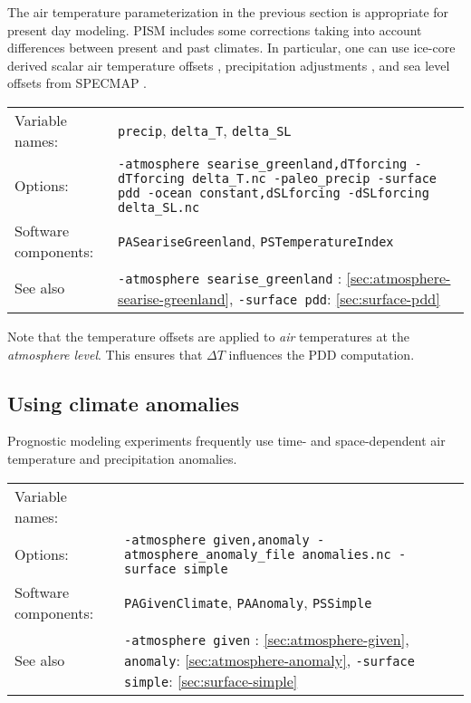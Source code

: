 \documentclass[titlepage,letterpaper,final]{scrartcl}
\begin{document}
The air temperature parameterization in the previous section is appropriate for
present  day  modeling. PISM  includes  some  corrections  taking into  account
differences  between present  and past  climates.  In particular,  one can  use
ice-core  derived   scalar  air  temperature   offsets  \cite{JohnsenetalGRIP},
precipitation  adjustments  \cite{Huybrechts02},  and  sea level  offsets  from
SPECMAP \cite{Imbrieetal1984}.

\begin{center}
  \begin{tabular}{lp{}}
    \toprule
    Variable names: & \texttt{precip}, \texttt{delta_T}, \texttt{delta_SL}\\
    Options: & \texttt{-atmosphere searise_greenland,dTforcing
      \mbox{-dTforcing delta_T.nc}
      -paleo_precip  -surface pdd \mbox{-ocean constant,dSLforcing}
      -dSLforcing delta_SL.nc} \\
    Software components: & \texttt{PASeariseGreenland}, \texttt{PSTemperatureIndex} \\
    See also & \texttt{-atmosphere searise_greenland} : \ref{sec:atmosphere-searise-greenland},
    \texttt{-surface pdd}: \ref{sec:surface-pdd} \\
    \bottomrule
  \end{tabular}
\end{center}

Note that the temperature offsets are applied to \emph{air} temperatures at the
\emph{atmosphere level}. This ensures that $\Delta T$ influences the PDD
computation.

\subsection{Using climate anomalies}
\label{sec:use-case-climate-anomalies}

Prognostic modeling experiments frequently use time- and space-dependent
air temperature and precipitation anomalies.

\begin{center}
  \begin{tabular}{lp{}}
    \toprule
    Variable names: & \\
    Options:  &  \texttt{-atmosphere given,anomaly  -atmosphere_anomaly_file
      anomalies.nc -surface simple} \\
    Software components: & \texttt{PAGivenClimate}, \texttt{PAAnomaly}, \texttt{PSSimple}\\
    See  also   &  \texttt{-atmosphere  given}   :  \ref{sec:atmosphere-given},
    \texttt{anomaly}: \ref{sec:atmosphere-anomaly}, \texttt{-surface simple}: \ref{sec:surface-simple}\\
    \bottomrule
  \end{tabular}
\end{center}
\end{document}
